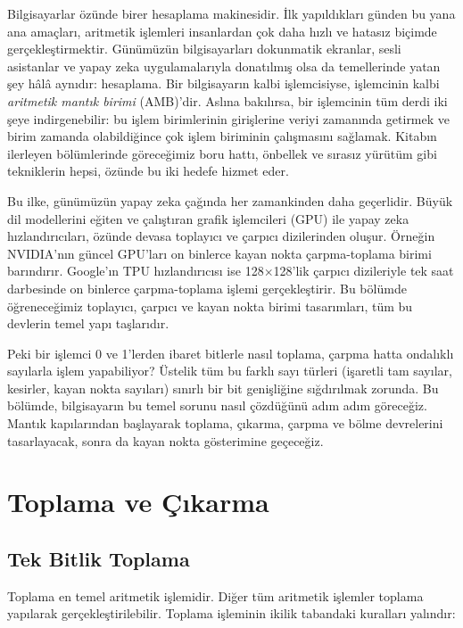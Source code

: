 Bilgisayarlar özünde birer hesaplama makinesidir. İlk yapıldıkları günden bu yana ana amaçları, aritmetik işlemleri insanlardan çok daha hızlı ve hatasız biçimde gerçekleştirmektir. Günümüzün bilgisayarları dokunmatik ekranlar, sesli asistanlar ve yapay zeka uygulamalarıyla donatılmış olsa da temellerinde yatan şey hâlâ aynıdır: hesaplama. Bir bilgisayarın kalbi işlemcisiyse, işlemcinin kalbi \emph{aritmetik mantık birimi} (AMB)'dir. Aslına bakılırsa, bir işlemcinin tüm derdi iki şeye indirgenebilir: bu işlem birimlerinin girişlerine veriyi zamanında getirmek ve birim zamanda olabildiğince çok işlem biriminin çalışmasını sağlamak. Kitabın ilerleyen bölümlerinde göreceğimiz boru hattı, önbellek ve sırasız yürütüm gibi tekniklerin hepsi, özünde bu iki hedefe hizmet eder.

Bu ilke, günümüzün yapay zeka çağında her zamankinden daha geçerlidir. Büyük dil modellerini eğiten ve çalıştıran grafik işlemcileri (GPU) ile yapay zeka hızlandırıcıları, özünde devasa toplayıcı ve çarpıcı dizilerinden oluşur. Örneğin NVIDIA'nın güncel GPU'ları on binlerce kayan nokta çarpma-toplama birimi barındırır. Google'ın TPU hızlandırıcısı ise 128$\times$128'lik çarpıcı dizileriyle tek saat darbesinde on binlerce çarpma-toplama işlemi gerçekleştirir. Bu bölümde öğreneceğimiz toplayıcı, çarpıcı ve kayan nokta birimi tasarımları, tüm bu devlerin temel yapı taşlarıdır.

Peki bir işlemci 0 ve 1'lerden ibaret bitlerle nasıl toplama, çarpma hatta ondalıklı sayılarla işlem yapabiliyor? Üstelik tüm bu farklı sayı türleri (işaretli tam sayılar, kesirler, kayan nokta sayıları) sınırlı bir bit genişliğine sığdırılmak zorunda. Bu bölümde, bilgisayarın bu temel sorunu nasıl çözdüğünü adım adım göreceğiz. Mantık kapılarından başlayarak toplama, çıkarma, çarpma ve bölme devrelerini tasarlayacak, sonra da kayan nokta gösterimine geçeceğiz.


\section{Toplama ve Çıkarma}
\label{sec:toplama-cikarma}

\subsection{Tek Bitlik Toplama}

Toplama en temel aritmetik işlemidir. Diğer tüm aritmetik işlemler toplama yapılarak gerçekleştirilebilir. Toplama işleminin ikilik tabandaki kuralları yalındır:

